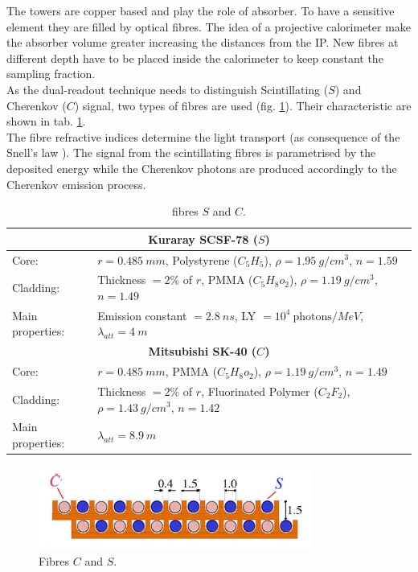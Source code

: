 The towers are copper based and play the role of absorber. To have a sensitive element they are filled by optical fibres. The idea of a projective calorimeter make the absorber volume greater increasing the distances from the IP. New fibres at different depth have to be placed inside the calorimeter to keep constant the sampling fraction.\\
As the dual-readout technique needs to distinguish Scintillating ($S$) and Cherenkov ($C$) signal, two types of fibres are used (fig. \ref{fig:CS_fibres}). Their characteristic are shown in tab. \ref{tab:fibres}.\\
The fibre refractive indices determine the light transport (as consequence of the Snell's law \cite{Snell}). The signal from the scintillating fibres is parametrised by the deposited energy while the Cherenkov photons are produced accordingly to the Cherenkov emission process.\\

\begin{table}
	\centering
	\setlength{\tabcolsep}{12pt}
	\begin{tabular}{lp{}}
		\toprule
		\multicolumn{2}{c}{\textbf{Kuraray SCSF-78 ($S$)}}	\\
		\midrule
		Core:				& $r = 0.485\ mm$, Polystyrene ($C_5H_5$), $\rho=1.95\ g/cm^3$, $n = 1.59$	\\
		Cladding: 			& Thickness $=2\%$ of $r$, PMMA ($C_5H_8o_2$), $\rho=1.19\ g/cm^3$, $n=1.49$	\\
		Main properties:	& Emission constant $= 2.8\ ns$, LY $= 10^4\ \text{photons}/MeV$, $\lambda_{att} = 4\ m$	\\
		\midrule
		\multicolumn{2}{c}{\textbf{Mitsubishi SK-40 ($C$)}}	\\
		\midrule
		Core:				& $r = 0.485\ mm$, PMMA ($C_5H_8o_2$), $\rho=1.19\ g/cm^3$, $n = 1.49$	\\
		Cladding: 			& Thickness $=2\%$ of $r$, Fluorinated Polymer ($C_2F_2$), $\rho=1.43\ g/cm^3$, $n=1.42$	\\
		Main properties:	& $\lambda_{att} = 8.9\ m$	\\
		\bottomrule
	\end{tabular}
	\caption{fibres $S$ and $C$.}
	\label{tab:fibres}
\end{table}

\begin{figure}
	\centering
	\includegraphics[width=0.8\textwidth]{IMG/DRCGeometry2}
	\caption{Fibres $C$ and $S$.}
	\label{fig:CS_fibres}
\end{figure}

